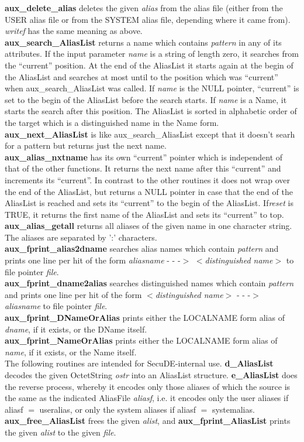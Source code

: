 {\bf aux\_delete\_alias} deletes the given {\em alias} from the alias file (either from
the USER alias file or from the SYSTEM alias file, depending where it came from).
{\em writef} has the same meaning as above.
\\ [1em]
{\bf aux\_search\_AliasList} returns a name which contains {\em pattern} in any of
its attributes. If the input parameter {\em name} is a string of length zero,
it searches from the ``current'' position. At the end of the AliasList it starts
again at the begin of the AliasList and searches at most until to the position
which was ``current'' when aux\_search\_AliasList was called. If {\em name} is the 
NULL pointer, ``current'' is set to the begin of the AliasList before the search starts.
If {\em name} is a Name, it starts the search after this position. The AliasList
is sorted in alphabetic order of the target which is a distinguished name in the Name form.
\\ [1em]
{\bf aux\_next\_AliasList} is like aux\_search\_AliasList except that it doesn't searh
for a pattern but returns just the next name. 
\\ [1em]
{\bf aux\_alias\_nxtname} has its own ``current'' pointer which is independent of that
of the other functions. It returns the next name after this ``current'' and increments
its ``current''. In contrast to the other routines it does not wrap over the end of
the AliasList, but returns a NULL pointer in case that the end of the AliasList
is reached and sets its ``current'' to the begin of the AliasList. If{\em reset} is TRUE,
it returns the first name of the AliasList and sets its ``current'' to top.
\\ [1em]
{\bf aux\_alias\_getall} returns all aliases of the given name in one character string.
The aliases are separated by ':' characters.
\\ [1em]
{\bf aux\_fprint\_alias2dname} searches alias names which contain {\em pattern} and
prints one line per hit of the form
\bc
{\em aliasname} - - -$>$ $<${\em distinguished name}$>$
\ec
to file pointer {\em file}.
\\ [1em]
{\bf aux\_fprint\_dname2alias} searches distinguished names which contain {\em pattern} and
prints one line per hit of the form
\bc
$<${\em distinguished name}$>$ - - -$>$  {\em aliasname}
\ec
to file pointer {\em file}.
\\ [1em]
{\bf aux\_fprint\_DNameOrAlias} prints either the LOCALNAME form alias of {\em dname},
if it exists, or the DName itself.
\\ [1em]
{\bf aux\_fprint\_NameOrAlias} prints either the LOCALNAME form alias of {\em name},
if it exists, or the Name itself.
\\ [1em]
The following routines are intended for SecuDE-internal use. {\bf d\_AliasList} decodes the
given OctetString {\em ostr} into an AliasList structure. {\bf e\_AliasList} does the reverse
process, whereby it encodes only those aliases of which the source is the same as the
indicated AliasFile {\em aliasf}, i.e. it encodes only the user aliases if aliasf $=$ useralias,
or only the system aliases if aliasf $=$ systemalias. {\bf aux\_free\_AliasList} frees
the given {\em alist}, and {\bf aux\_fprint\_AliasList} prints the given {\em alist}
to the given {\em file}.

